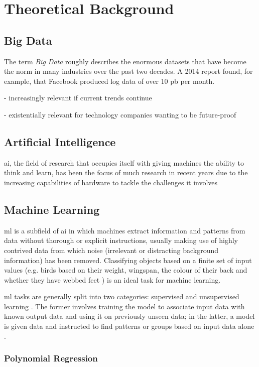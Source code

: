 \section{Theoretical Background}

\subsection{Big Data}
The term \textit{Big Data} roughly describes the enormous datasets that have become the norm in many industries over the past two decades. A 2014 report found, for example, that Facebook produced log data of over 10 \ac{pb} per month. \cite[]{chen_big_2014}

- increasingly relevant if current trends continue \cite[]{fan_mining_2013}

- existentially relevant for technology companies wanting to be future-proof

\subsection{Artificial Intelligence}
\ac{ai}, the field of research that occupies itself with giving machines the ability to think and learn, has been the focus of much research in recent years due to the increasing capabilities of hardware to tackle the challenges it involves

\subsection{Machine Learning}
\ac{ml} is a subfield of \ac{ai} in which machines extract information and patterns from data without thorough or explicit instructions, usually making use of highly contrived data from which noise (irrelevant or distracting background information) has been removed. Classifying objects based on a finite set of input values (e.g. birds based on their weight, wingspan, the colour of their back and whether they have webbed feet \cite[]{harrington_machine_2012}) is an ideal task for machine learning.

\ac{ml} tasks are generally split into two categories: supervised and unsupervised learning \cite[]{kelleher_fundamentals_2015}. The former involves training the model to associate input data with known output data and using it on previously unseen data; in the latter, a model is given data and instructed to find patterns or groups based on input data alone \cite[]{goodfellow_deep_2016}.

\subsubsection{Polynomial Regression}

